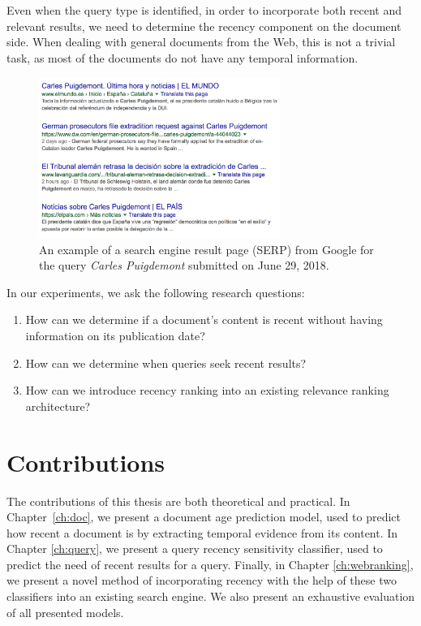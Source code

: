 Even when the query type is identified, in order to incorporate both recent and relevant results, we need to determine the recency component on the document side. When dealing with general documents from the Web, this is not a trivial task, as most of the documents do not have any temporal information.

\begin{figure}
  \centering
  \includegraphics[width=0.7\textwidth]{img/serp.png}
  \caption{An example of a search engine result page (SERP) from Google for the query \textit{Carles Puigdemont} submitted on June 29, 2018.}
  \label{fig:serp}
\end{figure}

In our experiments, we ask the following research questions:
\begin{enumerate}
    \item How can we determine if a document's content is recent without having information on its publication date?
    \item How can we determine when queries seek recent results?
    \item How can we introduce recency ranking into an existing relevance ranking architecture?
\end{enumerate}

\section{Contributions}
The contributions of this thesis are both theoretical and practical. In Chapter~\ref{ch:doc}, we present a document age prediction model, used to predict how recent a document is by extracting temporal evidence from its content. In Chapter \ref{ch:query}, we present a query recency sensitivity classifier, used to predict the need of recent results for a query. Finally, in Chapter \ref{ch:webranking}, we present a novel method of incorporating recency with the help of these two classifiers into an existing search engine. We also present an exhaustive evaluation of all presented models.
